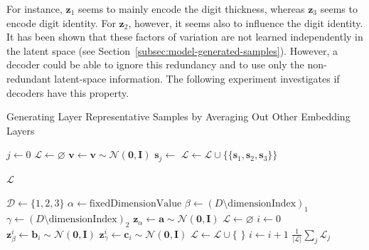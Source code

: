 For instance, $\bm{z}_1$ seems to mainly encode the digit thickness, whereas $\bm{z}_3$ seems to encode digit identity.
For $\bm{z}_2$, however, it seems also to influence the digit identity.
It has been shown that these factors of variation are not learned independently in the latent space (see Section~\ref{subsec:model-generated-samples}).
However, a decoder could be able to ignore this redundancy and to use only the non-redundant latent-space information.
The following experiment investigates if decoders have this property.
\begin{breakablealgorithm}
    \caption{Generating Layer Representative Samples by Averaging Out Other Embedding Layers}\label{alg:layer_representative_samples}
    \begin{algorithmic}[1]
            \State $j \gets 0$
            \State $\mathcal{L}\gets \varnothing$
                \State $\bm{v} \gets \bm{v} \sim \mathcal{N}(\bm{0}, \bm{I})$\label{line:fixing_v}
                    \State $\bm{s}_j \gets$ 
                \EndFor
                \State $\mathcal{L} \gets \mathcal{L} \cup \{\{\bm{s}_1, \bm{s}_2, \bm{s}_3\}\}$

            \EndWhile
            \State \Return $\mathcal{L}$
        \EndFunction

            \State $\mathcal{D} \gets \{1,2,3\}$
            \State $\alpha \gets \text{fixedDimensionValue}$
            \State $\beta \gets (D \setminus \text{dimensionIndex})_1$
            \State $\gamma \gets (D \setminus \text{dimensionIndex})_2$
            \State $\bm{z}_{\alpha} \gets \bm{a} \sim \mathcal{N}(\bm{0}, \bm{I})$
            \State $\mathcal{L}\gets \varnothing$
            \State $i \gets 0$
                \State $\bm{z}_{\beta}^i \gets \bm{b}_i \sim \mathcal{N}(\bm{0}, \bm{I})$
                \State $\bm{z}_{\gamma}^i \gets \bm{c}_i \sim \mathcal{N}(\bm{0}, \bm{I})$
                \State $\mathcal{L} \gets \mathcal{L} \cup \{$  $\}$
                \State $i \gets i + 1$
            \EndWhile
            \State \Return $\frac{1}{|\mathcal{L}|}\sum_j \mathcal{L}_j$
        \EndFunction
    \end{algorithmic}
\end{breakablealgorithm}

